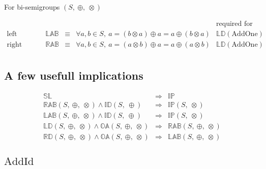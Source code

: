 \documentclass[10pt]{article}
\newcommand{\propname}[1]{{\mathbb{#1}}}
\begin{document}
For bi-semigroups $(S,\ \oplus,\ \otimes)$

\[ 
\begin{array}{c|ccl|l} 
   & 
   & 
   & 
   & \mbox{required for} 
   \\ \hline 
\mbox{left absorption}  
    & \propname{LAB}
    & \equiv 
    & \forall a, b\in S,\ a =  (b\otimes a) \oplus a = a \oplus (b \otimes a) 
    & \propname{LD}(\mathrm{AddOne})
   \\ 
\mbox{right absorption}  
    & \propname{RAB}
    & \equiv 
    & \forall a, b\in S,\ a =  (a\otimes b) \oplus a = a \oplus (a \otimes b) 
    & \propname{LD}(\mathrm{AddOne})
   \\ 
\end{array} 
\] 


\subsection{A few usefull implications} 

\[ 
\begin{array}{rcl} 
\propname{SL}
   & \Rightarrow 
   & \propname{IP}\\ 
\propname{RAB}(S,\ \oplus,\ \otimes) \wedge \propname{ID}(S,\ \oplus)
    & \Rightarrow 
    & \propname{IP}(S,\ \otimes)\\ 
\propname{LAB}(S,\ \oplus,\ \otimes) \wedge \propname{ID}(S,\ \oplus)
    & \Rightarrow 
    & \propname{IP}(S,\ \otimes)\\ 
\propname{LD}(S,\ \oplus,\ \otimes) \wedge \propname{OA}(S,\ \oplus,\ \otimes)
    & \Rightarrow 
    & \propname{RAB}(S,\ \oplus,\ \otimes) \\ 
\propname{RD}(S,\ \oplus,\ \otimes) \wedge \propname{OA}(S,\ \oplus,\ \otimes) 
    & \Rightarrow 
    & \propname{LAB}(S,\ \oplus,\ \otimes)
\end{array} 
\] 



\subsection{$\mathrm{AddId}$} 
\end{document}

